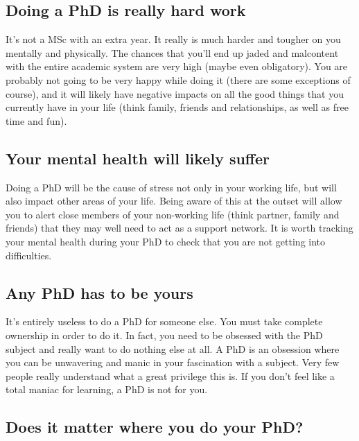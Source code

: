 \documentclass[
]{krantz}
\begin{document}
\hypertarget{doing-a-phd-is-really-hard-work}{%
\subsection{Doing a PhD is really hard work}\label{doing-a-phd-is-really-hard-work}}

It's not a MSc with an extra year. It really is much harder and tougher on you mentally and physically. The chances that you'll end up jaded and malcontent with the entire academic system are very high (maybe even obligatory). You are probably not going to be very happy while doing it (there are some exceptions of course), and it will likely have negative impacts on all the good things that you currently have in your life (think family, friends and relationships, as well as free time and fun).

\hypertarget{your-mental-health-will-likely-suffer}{%
\subsection{Your mental health will likely suffer}\label{your-mental-health-will-likely-suffer}}

Doing a PhD will be the cause of stress not only in your working life, but will also impact other areas of your life. Being aware of this at the outset will allow you to alert close members of your non-working life (think partner, family and friends) that they may well need to act as a support network. It is worth tracking your mental health during your PhD to check that you are not getting into difficulties.

\hypertarget{any-phd-has-to-be-yours}{%
\subsection{Any PhD has to be yours}\label{any-phd-has-to-be-yours}}

It's entirely useless to do a PhD for someone else. You must take complete ownership in order to do it. In fact, you need to be obsessed with the PhD subject and really want to do nothing else at all. A PhD is an obsession where you can be unwavering and manic in your fascination with a subject. Very few people really understand what a great privilege this is. If you don't feel like a total maniac for learning, a PhD is not for you.

\hypertarget{does-it-matter-where-you-do-your-phd}{%
\subsection{Does it matter where you do your PhD?}\label{does-it-matter-where-you-do-your-phd}}
\end{document}
